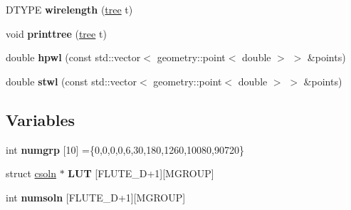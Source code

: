 \begin{DoxyCompactItemize}
\item 
\hypertarget{namespaceophidian_1_1interconnection_aafc2acc4cced869e1901dac341c06080}{D\-T\-Y\-P\-E {\bfseries wirelength} (\hyperlink{structophidian_1_1interconnection_1_1tree}{tree} t)}\label{namespaceophidian_1_1interconnection_aafc2acc4cced869e1901dac341c06080}

\item 
\hypertarget{namespaceophidian_1_1interconnection_a5cddd51e3f6f16752c84ed9471fd4ce5}{void {\bfseries printtree} (\hyperlink{structophidian_1_1interconnection_1_1tree}{tree} t)}\label{namespaceophidian_1_1interconnection_a5cddd51e3f6f16752c84ed9471fd4ce5}

\item 
\hypertarget{namespaceophidian_1_1interconnection_a2cbfe985312eaa1afe39a7602df8a68b}{double {\bfseries hpwl} (const std\-::vector$<$ geometry\-::point$<$ double $>$ $>$ \&points)}\label{namespaceophidian_1_1interconnection_a2cbfe985312eaa1afe39a7602df8a68b}

\item 
\hypertarget{namespaceophidian_1_1interconnection_aa96a309fc4b8d957125433cbf9204358}{double {\bfseries stwl} (const std\-::vector$<$ geometry\-::point$<$ double $>$ $>$ \&points)}\label{namespaceophidian_1_1interconnection_aa96a309fc4b8d957125433cbf9204358}

\end{DoxyCompactItemize}
\subsection*{Variables}
\begin{DoxyCompactItemize}
\item 
\hypertarget{namespaceophidian_1_1interconnection_a4971c5289256d5a6c52e4c33c1522946}{int {\bfseries numgrp} \mbox{[}10\mbox{]} =\{0,0,0,0,6,30,180,1260,10080,90720\}}\label{namespaceophidian_1_1interconnection_a4971c5289256d5a6c52e4c33c1522946}

\item 
\hypertarget{namespaceophidian_1_1interconnection_ac1019eb927a987b3fc441b4780f3e39a}{struct \hyperlink{structophidian_1_1interconnection_1_1csoln}{csoln} $\ast$ {\bfseries L\-U\-T} \mbox{[}F\-L\-U\-T\-E\-\_\-\-D+1\mbox{]}\mbox{[}M\-G\-R\-O\-U\-P\mbox{]}}\label{namespaceophidian_1_1interconnection_ac1019eb927a987b3fc441b4780f3e39a}

\item 
\hypertarget{namespaceophidian_1_1interconnection_abb432985df6a870a130521f3fa43b773}{int {\bfseries numsoln} \mbox{[}F\-L\-U\-T\-E\-\_\-\-D+1\mbox{]}\mbox{[}M\-G\-R\-O\-U\-P\mbox{]}}\label{namespaceophidian_1_1interconnection_abb432985df6a870a130521f3fa43b773}

\end{DoxyCompactItemize}
